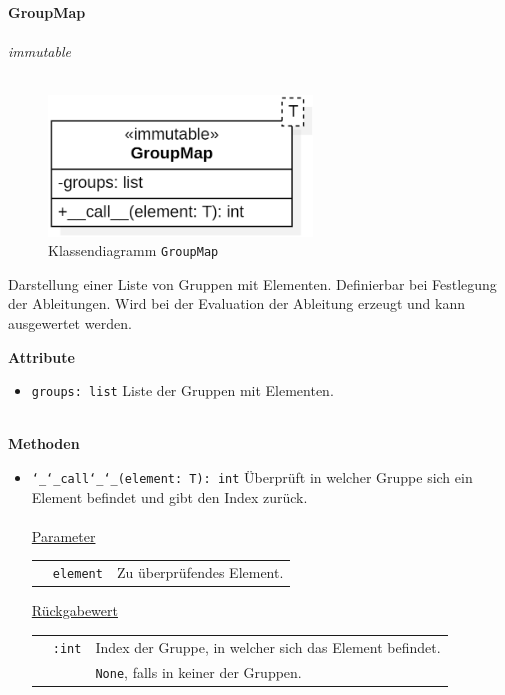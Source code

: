 \documentclass{article}
\begin{document}
\newpage
\textbf{\large{GroupMap}}\\\\
\textit{\flqq{}immutable\frqq}\normalsize\\\\
\begin{figure}[H]%
    \centering
    \includegraphics[width=7cm]{entwurf/Entwurf_dokument/img/cls/model/GroupMap.png}
    \caption{Klassendiagramm \texttt{GroupMap}}
\end{figure}

Darstellung einer Liste von Gruppen mit Elementen. Definierbar bei Festlegung der Ableitungen. Wird bei der Evaluation der Ableitung erzeugt und kann ausgewertet werden.
\newline \newline

\textbf{Attribute}
\begin{itemize}
\item \texttt{groups: list} \newline Liste der Gruppen mit Elementen.
\\\\
\end{itemize}

\textbf{Methoden}
\begin{itemize}
\item \texttt{\char`_\char`_call\char`_\char`_(element: T): int} \newline Überprüft in welcher Gruppe sich ein Element befindet und gibt den Index zurück.
\\\\
\underline{{Parameter}}

\begin{tabular}{lll}
 & \texttt{element} & Zu überprüfendes Element. \\
\end{tabular}

\underline{Rückgabewert}

\begin{tabular}{lll}
 & \texttt{:int} & Index der Gruppe, in welcher sich das Element befindet. \\
 && \texttt{None}, falls in keiner der Gruppen.\\
\end{tabular}
\end{itemize}
\end{document}

